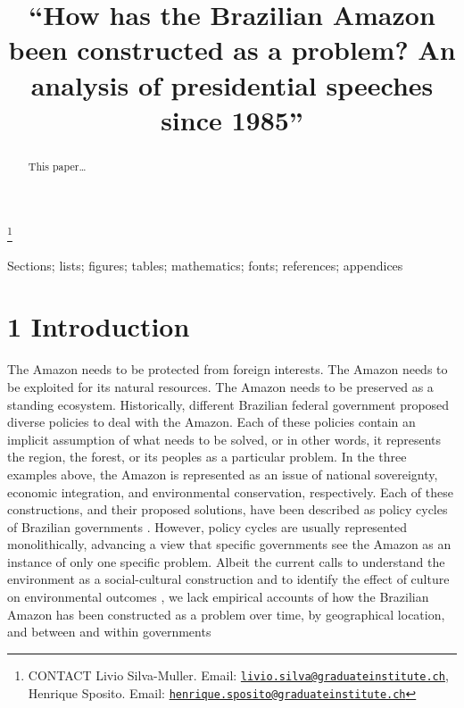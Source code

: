 \documentclass[]{interact}
\theoremstyle{plain}%
\theoremstyle{definition}
\theoremstyle{remark}
\begin{document}

\title{``How has the Brazilian Amazon been constructed as a problem? An
analysis of presidential speeches since 1985''}


\author{
}

\thanks{CONTACT Livio
Silva-Muller. Email: \href{mailto:livio.silva@graduateinstitute.ch}{\nolinkurl{livio.silva@graduateinstitute.ch}}, Henrique
Sposito. Email: \href{mailto:henrique.sposito@graduateinstitute.ch}{\nolinkurl{henrique.sposito@graduateinstitute.ch}}}

\maketitle

\begin{abstract}
This paper\ldots{}
\end{abstract}

\begin{keywords}
Sections; lists; figures; tables; mathematics; fonts; references;
appendices
\end{keywords}

\hypertarget{introduction}{%
\section{1 Introduction}\label{introduction}}

The Amazon needs to be protected from foreign interests. The Amazon
needs to be exploited for its natural resources. The Amazon needs to be
preserved as a standing ecosystem. Historically, different Brazilian
federal government proposed diverse policies to deal with the Amazon.
Each of these policies contain an implicit assumption of what needs to
be solved, or in other words, it represents the region, the forest, or
its peoples as a particular problem. In the three examples above, the
Amazon is represented as an issue of national sovereignty, economic
integration, and environmental conservation, respectively. Each of these
constructions, and their proposed solutions, have been described as
policy cycles of Brazilian governments
\citep{acker2014, hecht1990, hochstetler2007}. However, policy cycles
are usually represented monolithically, advancing a view that specific
governments see the Amazon as an instance of only one specific problem.
Albeit the current calls to understand the environment as a
social-cultural construction and to identify the effect of culture on
environmental outcomes \citep{lepolaindewaroux2021}, we lack empirical
accounts of how the Brazilian Amazon has been constructed as a problem
over time, by geographical location, and between and within governments
\end{document}
